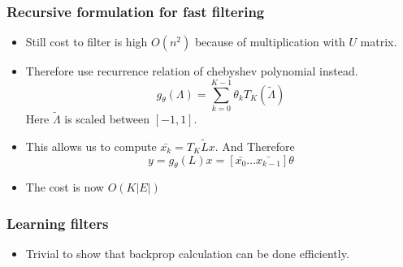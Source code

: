 \documentclass{beamer}
\begin{document}
\begin{frame}
  \frametitle{Recursive formulation for fast filtering}
  \begin{itemize}
  \item Still cost to filter is high $O(n^2)$ because of multiplication with $U$ matrix.
  \item Therefore use recurrence relation of chebyshev polynomial instead.
    $$g_{\theta}(\Lambda) = \sum_{k=0}^{K-1}\theta_k T_K(\tilde{\Lambda})$$
    Here $\tilde{\Lambda}$ is scaled between $[-1,1]$.
  \item This allows us to compute $\bar{x_k} = T_K{\tilde{L}}x$. And Therefore
    $$ y = g_{\theta}(L)x = [\bar{x_0}...\bar{x_{k-1}}]\theta$$
  \item The cost is now $O(K|E|)$
  \end{itemize}
\end{frame}

\begin{frame}
  \frametitle{Learning filters}
  \begin{itemize}
  \item Trivial to show that backprop calculation can be done efficiently.
  \end{itemize}
\end{frame}



\end{document}
